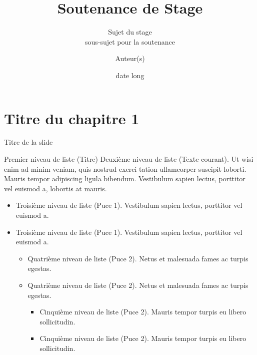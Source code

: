 \documentclass[A4,svgnames,9pt,aspectratio=169]{beamer}
\title[titrecourt]{Soutenance de Stage}
\subtitle{Sujet du stage\\ sous-sujet pour la soutenance}
\date[00/00/202X]{date long}
\author[A. et al.]{Auteur(s)}
\begin{document}

\frame{\titlepage}


\renewcommand{\contentsname}{Sommaire}



\frame{\tocpage}

 
\section{Titre du chapitre 1}
\frame{\sectionpage}


\begin{frame}{Titre de la slide}
    \begin{block}{Premier niveau de liste (Titre)}
       Deuxième niveau de liste (Texte courant). Ut wisi enim ad minim veniam, quis nostrud exerci tation
       ullamcorper suscipit loborti. Mauris tempor adipiscing ligula bibendum. Vestibulum sapien lectus,
       porttitor vel euismod a, lobortis at mauris.
      \begin{itemize}
         \item Troisième niveau de liste (Puce 1). Vestibulum sapien lectus, porttitor vel euismod a.
         \item Troisième niveau de liste (Puce 1). Vestibulum sapien lectus, porttitor vel euismod a.
         \begin{itemize}
            \item Quatrième niveau de liste (Puce 2). Netus et malesuada fames ac turpis egestas.
            \item Quatrième niveau de liste (Puce 2). Netus et malesuada fames ac turpis egestas.
            \begin{itemize}
               \item Cinquième niveau de liste (Puce 2). Mauris tempor turpis eu libero sollicitudin.
               \item Cinquième niveau de liste (Puce 2). Mauris tempor turpis eu libero sollicitudin.
            \end{itemize}
          \end{itemize}
        \end{itemize}
   \end{block}
\end{frame}
\end{document}
